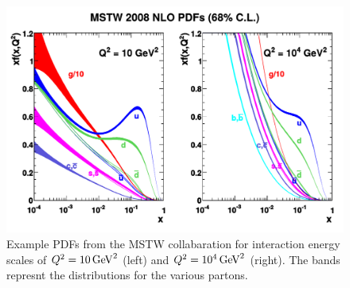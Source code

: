 \begin{figure}[!htbs]
    \centering
    \includegraphics[width=\textwidth]{figures/mstw_pdfs.pdf}
    \caption[
        Example PDFs from the MSTW collabaration.
    ]{
        Example PDFs from the MSTW collabaration for interaction energy scales
        of $\InteractionEnergy = \SI{10}{\GeV\squared}$ (left) and
        $\InteractionEnergy = \SI{e4}{\GeV\squared}$ (right). The bands
        represnt the  distributions for the various partons.
    }
    \label{fig:mstw_pdf}
\end{figure}
